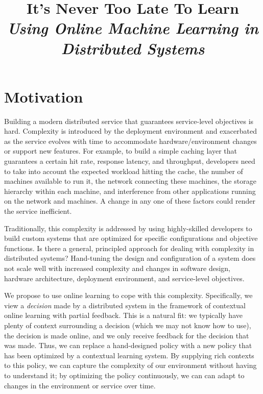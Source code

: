 \documentclass[a4paper,twocolumn]{article}
\title{
  It's Never Too Late To Learn\\
  \emph{Using Online Machine Learning in Distributed Systems}
}
\author{}
\date{}
\begin{document}
\maketitle

\section{Motivation}

Building a modern distributed service that guarantees service-level objectives
is hard. Complexity is introduced by the deployment environment and exacerbated
as the service evolves with time to accommodate hardware/environment changes or
support new features.
For example, to build a simple caching layer that guarantees a certain hit rate,
response latency, and throughput, developers need to take into account the expected
workload hitting the cache, the number of machines available to run it, the network
connecting these machines, the storage hierarchy within each machine, and interference
from other applications running on the network and machines.  A change in any one
of these factors could render the service inefficient.

Traditionally, this complexity is addressed by using highly-skilled developers
to build custom systems that are optimized for specific configurations and
objective functions.  Is there a general, principled approach for dealing with
complexity in distributed systems? Hand-tuning the design and configuration of a system
does not scale well with increased complexity and changes in software design, hardware
architecture, deployment environment, and service-level objectives.

We propose to use online learning to cope with this complexity. Specifically, we
view a {\em decision} made by a distributed system in the framework of
contextual online learning with partial feedback. This is a natural fit: we typically
have plenty of context surrounding a decision (which we may not know how to use), the decision
is made online, and we only receive feedback for the decision that was made. Thus, we can
replace a hand-designed policy with a new policy that has been optimized by a contextual
learning system. By supplying rich contexts to this policy, we can capture the complexity of
our environment without having to understand it; by optimizing the policy continuously, we can
can adapt to changes in the environment or service over time.
\end{document}
